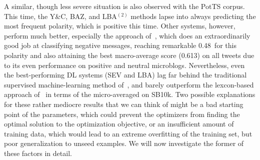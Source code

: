 A similar, though less severe situation is also observed with the
PotTS corpus.  This time, the Y\&C, BAZ, and LBA$^{(2)}$ methods lapse
into always predicting the most frequent polarity, which is positive
this time.  Other systems, however, perform much better, especially
the approach of~\citet{Severyn:15}, which does an extraordinarily good
job at classifying negative messages, reaching remarkable 0.48~\F for
this polarity and also attaining the best macro-average score (0.613)
on all tweets due to its even performance on positive and neutral
microblogs.  Nevertheless, even the best-performing DL systems (SEV
and LBA) lag far behind the traditional supervised machine-learning
method of~\citet{Mohammad:13}, and barely outperform the lexcon-based
approach of~\citet{Hu:04} in terms of the micro-averaged \F{} on
SB10k.  Two possible explanations for these rather mediocre results
that we can think of might be a bad starting point of the parameters,
which could prevent the optimizers from finding the optimal solution
to the optimization objective, or an insufficient amount of training
data, which would lead to an extreme overfitting of the training set,
but poor generalization to unseed examples.  We will now investigate
the former of these factors in detail.



